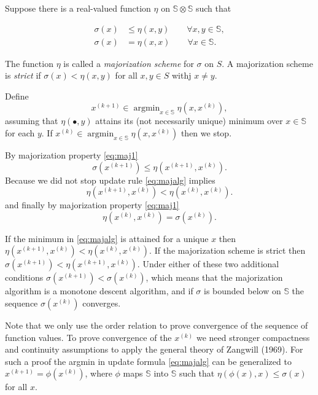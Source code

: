 \documentclass[
  12pt,
]{article}
\begin{document}
Suppose there is a real-valued function \(\eta\) on
\(\mathbb{S}\otimes\mathbb{S}\) such that

\begin{align}
\sigma(x)&\leq\eta(x,y)\qquad\forall x,y\in\mathbb{S},\label{eq:maj1}\\
\sigma(x)&=\eta(x,x)\qquad\forall x\in\mathbb{S}.\label{eq:maj2}
\end{align}

The function \(\eta\) is called a \emph{majorization scheme} for \(\sigma\) on
\(S\). A majorization scheme is \emph{strict} if \(\sigma(x)<\eta(x,y)\) for all
\(x,y\in S\) withj \(x\not=y\).

Define \begin{equation}
x^{(k+1)}\in\mathop{\text{argmin}}_{x\in\mathbb{S}}\eta(x,x^{(k)}),
\label{eq:majalg}
\end{equation} assuming that \(\eta(\bullet,y)\) attains its (not
necessarily unique) minimum over \(x\in\mathbb{S}\) for each \(y\). If
\(x^{(k)}\in\mathop{\text{argmin}}_{x\in\mathbb{S}}\eta(x,x^{(k)})\)
then we stop.

By majorization property \eqref{eq:maj1}
\begin{equation}
\sigma(x^{(k+1)})\leq\eta(x^{(k+1)},x^{(k)}).
\end{equation}
Because we did not stop update rule \eqref{eq:majalg} implies
\begin{equation}
\eta(x^{(k+1)},x^{(k)})<\eta(x^{(k)},x^{(k)}).
\end{equation}
and finally by majorization property \eqref{eq:maj1}
\begin{equation}
\eta(x^{(k)},x^{(k)})=\sigma(x^{(k)}).
\end{equation}

If the minimum in \eqref{eq:majalg} is attained for a unique \(x\) then
\(\eta(x^{(k+1)},x^{(k)})<\eta(x^{(k)},x^{(k)})\). If the majorization
scheme is strict then \(\sigma(x^{(k+1)})<\eta(x^{(k+1)},x^{(k)})\). Under
either of these two additional conditions
\(\sigma(x^{(k+1)})<\sigma(x^{(k)})\), which means that the majorization
algorithm is a monotone descent algorithm, and if \(\sigma\) is bounded
below on \(\mathbb{S}\) the sequence \(\sigma(x^{(k)})\) converges.

Note that we only use the order relation to prove convergence of the
sequence of function values. To prove convergence of the \(x^{(k)}\) we
need stronger compactness and continuity assumptions to apply the
general theory of Zangwill (1969). For such a proof the argmin in update
formula \eqref{eq:majalg} can be generalized to
\(x^{(k+1)}=\phi(x^{(k)})\), where \(\phi\) maps \(\mathbb{S}\) into
\(\mathbb{S}\) such that \(\eta(\phi(x),x)\leq\sigma(x)\) for all \(x\).
\end{document}

